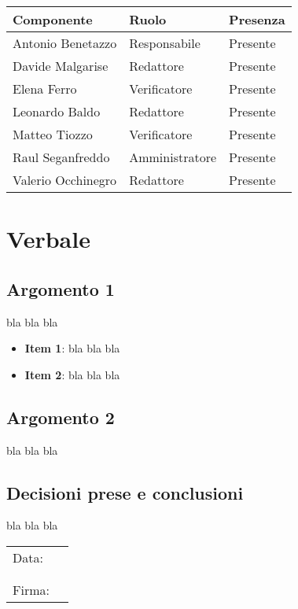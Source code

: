 \documentclass[italian,12pt]{article} %
\begin{document}
\begin{flushleft}
	\begin{table}[!h]
	\begin{tabular}{ |l|l|l| } 
		\hline
		\textbf{Componente} & \textbf{Ruolo} & \textbf{Presenza} \\
		\hline 
		Antonio Benetazzo 	& Responsabile   & Presente \\
		Davide Malgarise 	& Redattore      & Presente \\
		Elena Ferro 		& Verificatore   & Presente \\
		Leonardo Baldo 		& Redattore      & Presente \\ 
		Matteo Tiozzo 		& Verificatore   & Presente \\ 
		Raul Seganfreddo 	& Amministratore & Presente \\
		Valerio Occhinegro 	& Redattore      & Presente \\
		\hline
	\end{tabular}
	\end{table}
\end{flushleft}

\newpage

\section{Verbale}

\subsection{Argomento 1}
bla bla bla
\begin{itemize}
	\item \textbf{Item 1}: bla bla bla
	\item \textbf{Item 2}: bla bla bla
\end{itemize}

\subsection{Argomento 2}
bla bla bla

\subsection{Decisioni prese e conclusioni}
bla bla bla


\newpage
\begin{table}[b]
	\begin{tabular}{@{}p{.5in}p{4in}@{}}
		Data:  & \hrulefill \\
			   &     		\\
			   &     		\\
		Firma: & \hrulefill \\
	\end{tabular}
	\end{table}
\end{document}
